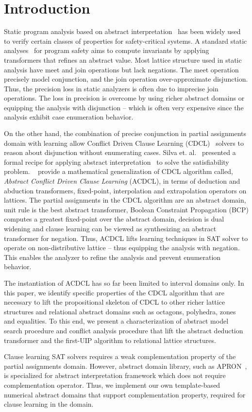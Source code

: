 \section{Introduction}
%
Static program analysis based on abstract 
interpretation~\cite{DBLP:conf/emsoft/Cousot07} has been widely used to
verify certain classes of properties for safety-critical systems.  A 
standard static analyses~\cite{se2011} for program safety aims to compute 
invariants by applying transformers that refines an abstract 
value.  Most lattice structure used in static analysis have 
meet and join operations but lack negations.  The meet operation 
precisely model conjunction, and the join operation over-approximate 
disjunction. Thus, the precision loss in static analyzers is often 
due to imprecise join operations. The loss in precision is overcome 
by using richer abstract domains or equipping the analysis with disjunction --
which is often very expensive since the analysis exhibit case enumeration 
behavior. 

On the other hand, the combination of precise conjunction in partial assignments 
domain with learning allow Conflict Driven Clause Learning (CDCL)~\cite{cdcl} 
solvers to reason about disjunction without enumerating cases.  
Silva et. al.~\cite{tacas12, sas12, dhk2013-popl} presented 
a formal recipe for applying abstract interpretation~\cite{se2011} to solve the 
satisfiability problem.  ~\cite{sas12} provide a mathematical generalization 
of CDCL algorithm called, {\em Abstract Conflict Driven Clause Learning} (ACDCL), 
in terms of deduction and abduction transformers, fixed-point, interpolation 
and extrapolation operators on lattices.  The partial assignments in the 
CDCL algorithm are an abstract domain, unit rule is the best abstract 
transformer,  Boolean Constraint Propagation (BCP) computes a greatest fixed-point 
over the abstract domain, decision is dual widening and clause learning can be 
viewed as synthesizing an abstract transformer for negation.  Thus, ACDCL 
lifts learning techniques in SAT solver to operate on non-distributive 
lattice -- thus equipping the analysis with negation. This enables the 
analyzer to refine the analysis and prevent enumeration behavior.

The instantiation of ACDCL has so far been limited to interval domains only.  
In this paper, we identify specific properties of the CDCL algorithm that 
are necessary to lift the propositional skeleton of CDCL to other richer 
lattice structures and relational abstract domains such as octagons, 
polyhedra, zones and equalities.  To this end, we present a 
characterization of abstract model search procedure and conflict 
analysis procedure that lift the abstract deduction transformer and the 
first-UIP algorithm to relational lattice structures. 

Clause learning SAT solvers requires a weak complementation property 
of the partial assignments domain.  However,  abstract domain 
library, such as APRON~\cite{apron}, is specialized for abstract 
interpretation framework which does not require complementation 
operator.  Thus, we implement our own template-based numerical abstract 
domains that support complementation property, required for clause learning 
in the domain.  

